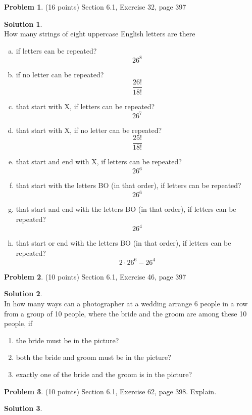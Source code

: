 \documentclass{article}
\theoremstyle{definition}
\newtheorem{problem}{Problem}
\newtheorem*{solution}{Solution}
\begin{document}
\begin{problem} (16 points) 
Section 6.1, Exercise 32, page 397
\end{problem}
\begin{solution} \ \\
How many strings of eight uppercase English letters are
there
\begin{enumerate}[a)]
  \item if letters can be repeated?
  $$26^8$$
  \item if no letter can be repeated?
  $$\dfrac{26!}{18!}$$
  \item that start with X, if letters can be repeated?
  $$26^7$$
  \item that start with X, if no letter can be repeated?
  $$ \dfrac{25!}{18!}$$
  \item that start and end with X, if letters can be repeated?
  $$26^6$$
  \item that start with the letters BO (in that order), if letters can be repeated?
  $$26^6$$
  \item that start and end with the letters BO (in that order), if letters can be repeated?
  $$26^4$$
  \item that start or end with the letters BO (in that order), if letters can be repeated?
  $$2\cdot 26^6 - 26^4$$
\end{enumerate}
\end{solution}

\begin{problem} (10 points) 
Section 6.1, Exercise 46, page 397
\end{problem}
\begin{solution} \ \\
In how many ways can a photographer at a wedding arrange 6 people in a row from a group of 10 people, where
the bride and the groom are among these 10 people, if
\begin{enumerate}
  \item the bride must be in the picture?
  \item both the bride and groom must be in the picture?
  \item exactly one of the bride and the groom is in the picture?
\end{enumerate}
\end{solution}

\begin{problem} (10 points) 
Section 6.1, Exercise 62, page 398.  Explain.
\end{problem}
\begin{solution} 
\end{solution}
\end{document}
